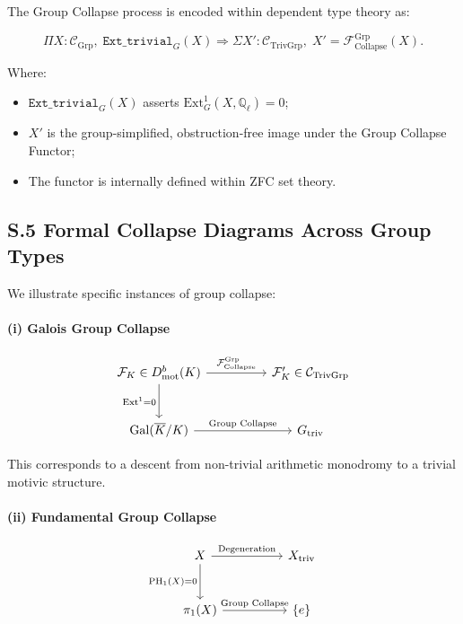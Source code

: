 \documentclass[11pt]{article}
\begin{document}
The Group Collapse process is encoded within dependent type theory as:

\[
\Pi X : \mathcal{C}_{\mathrm{Grp}},\;
\texttt{Ext\_trivial}_G(X)
\Rightarrow
\Sigma X' : \mathcal{C}_{\mathrm{TrivGrp}},\;
X' = \mathcal{F}_{\mathrm{Collapse}}^{\mathrm{Grp}}(X).
\]

Where:
\begin{itemize}
    \item $\texttt{Ext\_trivial}_G(X)$ asserts $\mathrm{Ext}^1_G(X, \mathbb{Q}_\ell) = 0$;
    \item $X'$ is the group-simplified, obstruction-free image under the Group Collapse Functor;
    \item The functor is internally defined within ZFC set theory.
\end{itemize}

\subsection*{S.5 Formal Collapse Diagrams Across Group Types}

We illustrate specific instances of group collapse:

\paragraph{(i) Galois Group Collapse}

\[
\begin{tikzcd}[column sep=huge, row sep=large]
\mathcal{F}_K \in D^b_{\mathrm{mot}}(K) \arrow[r, "{\mathcal{F}_{\mathrm{Collapse}}^{\mathrm{Grp}}}"] \arrow[d, swap, "{\mathrm{Ext}^1 = 0}"]
& \mathcal{F}_K' \in \mathcal{C}_{\mathrm{TrivGrp}} \\
\mathrm{Gal}(\overline{K}/K) \arrow[r, "{\text{Group Collapse}}"]
& G_{\mathrm{triv}}
\end{tikzcd}
\]

This corresponds to a descent from non-trivial arithmetic monodromy to a trivial motivic structure.

\paragraph{(ii) Fundamental Group Collapse}

\[
\begin{tikzcd}[column sep=huge, row sep=large]
X \arrow[r, "{\mathrm{Degeneration}}"] \arrow[d, swap, "{\mathrm{PH}_1(X) = 0}"]
& X_{\mathrm{triv}} \\
\pi_1(X) \arrow[r, "{\text{Group Collapse}}"]
& \{e\}
\end{tikzcd}
\]
\end{document}
